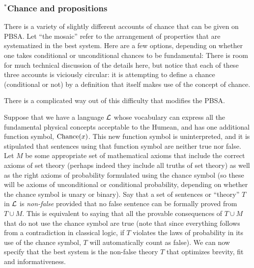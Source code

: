 \subsubsection{$^*$Chance and propositions}
There is a variety of slightly different accounts of chance that can be given on PBSA. Let ``the mosaic'' refer to the arrangement of
properties that are systematized in the best system. Here are a few options, depending on whether one takes conditional or unconditional
chances to be fundamental:
There is room for much technical discussion of the details here, but notice that each of these three accounts is viciously circular: it
is attempting to define a chance (conditional or not) by a definition that itself makes use of the concept of chance.

There is a complicated way out of this difficulty that modifies the PBSA.

Suppose that we have a language $\mathcal L$ whose vocabulary can express all the fundamental physical concepts acceptable to 
the Humean, and has one additional function symbol, $\operatorname{Chance}(x)$. This new function symbol is uninterpreted, and  it is stipulated that sentences using that function symbol are 
neither true nor false. Let $M$ be some appropriate set of mathematical axioms that include the correct axioms of set theory (perhaps indeed
they include all truths of set theory) as well as the 
right axioms of probability formulated using the chance symbol (so these will be axioms of unconditional or conditional probability, depending 
on whether the chance symbol is unary or binary).  Say that a set of sentences or ``theory'' $T$ in $\mathcal L$ is \textit{non-false} provided that no false sentence can be formally proved from $T\cup M$. This is equivalent to saying that all the provable consequences of $T\cup M$ that do 
not use the chance symbol are true (note that since everything follows from a contradiction in classical logic, if
$T$ violates the laws of probability in its use of the chance symbol, $T$ will automatically count as false). We can now specify that the best system is the non-false theory $T$ that optimizes brevity, fit and 
informativeness. 

